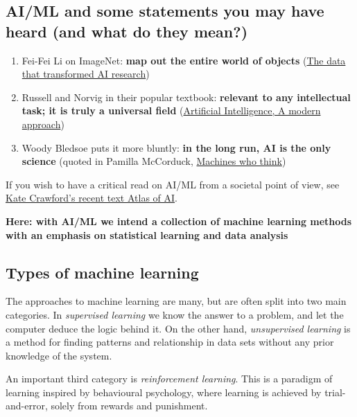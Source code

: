 \documentclass[%
oneside,                 %
final,                   %
10pt]{article}
\begin{document}
\subsection{AI/ML and some statements you may have heard (and what do they mean?)}

\begin{enumerate}
\item Fei-Fei Li on ImageNet: \textbf{map out the entire world of objects} (\href{{https://cacm.acm.org/news/219702-the-data-that-transformed-ai-research-and-possibly-the-world/fulltext}}{The data that transformed AI research})

\item Russell and Norvig in their popular textbook: \textbf{relevant to any intellectual task; it is truly a universal field} (\href{{http://aima.cs.berkeley.edu/}}{Artificial Intelligence, A modern approach})

\item Woody Bledsoe puts it more bluntly: \textbf{in the long run, AI is the only science} (quoted in Pamilla McCorduck, \href{{https://www.pamelamccorduck.com/machines-who-think}}{Machines who think})
\end{enumerate}

\noindent
If you wish to have a critical read on AI/ML from a societal point of view, see \href{{https://www.katecrawford.net/}}{Kate Crawford's recent text Atlas of AI}. 

\textbf{Here: with AI/ML we intend a collection of machine learning methods with an emphasis on statistical learning and data analysis}

\subsection{Types of machine learning}

\begin{block}{}
The approaches to machine learning are many, but are often split into two main categories. 
In \emph{supervised learning} we know the answer to a problem,
and let the computer deduce the logic behind it. On the other hand, \emph{unsupervised learning}
is a method for finding patterns and relationship in data sets without any prior knowledge of the system.

An important  third category is  \emph{reinforcement learning}. This is a paradigm 
of learning inspired by behavioural psychology, where learning is achieved by trial-and-error, 
solely from rewards and punishment.
\end{block}
\end{document}
